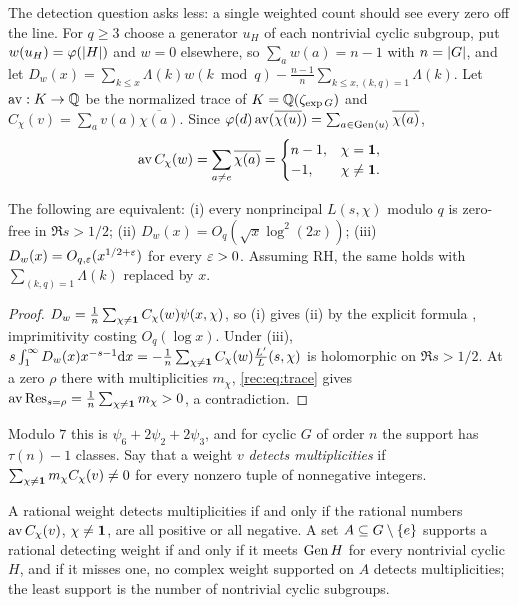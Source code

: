 The detection question asks less: a single weighted count should see every zero off the line. For
$q\ge3$ choose a generator $u_H$ of each nontrivial cyclic subgroup, put $w(u_H)=\varphi(\lvert H\rvert)$ and
$w=0$ elsewhere, so $\sum_aw(a)=n-1$ with $n=\lvert G\rvert$, and let
$D_w(x)=\sum_{k\le x}\Lambda(k)w(k\bmod q)-\frac{n-1}n\sum_{k\le x,(k,q)=1}\Lambda(k)$. Let
$\operatorname{av}:K\to\mathbb{Q}$ be the normalized trace of $K=\mathbb{Q}(\zeta_{\exp G})$ and $C_\chi(v)=\sum_av(a)\overline{\chi(a)}$.
Since $\varphi(d)\operatorname{av}(\overline{\chi(u)})=\sum_{a\in\operatorname{Gen}\langle u\rangle}\overline{\chi(a)}$,
\begin{equation}\label{rec:eq:trace}
 \operatorname{av} C_\chi(w)=\sum_{a\ne e}\overline{\chi(a)}=\begin{cases}n-1,&\chi=\mathbf{1},\\-1,&\chi\ne\mathbf{1}.\end{cases}
\end{equation}

\begin{theorem}\label{rec:thm:sparsecount}
The following are equivalent: \textup{(i)} every nonprincipal $L(s,\chi)$ modulo $q$ is zero-free in
$\Re s>1/2$; \textup{(ii)} $D_w(x)=O_q(\sqrt x\log^2(2x))$; \textup{(iii)} $D_w(x)=O_{q,\varepsilon}(x^{1/2+\varepsilon})$
for every $\varepsilon>0$. Assuming RH, the same holds with $\sum_{(k,q)=1}\Lambda(k)$ replaced by $x$.
\end{theorem}

\begin{proof}
$D_w=\frac1n\sum_{\chi\ne\mathbf{1}}C_\chi(w)\psi(x,\chi)$, so (i) gives (ii) by the explicit formula
\cite{ErnvallHytonenPalojarvi2022Explicit}, imprimitivity costing $O_q(\log x)$. Under (iii),
$s\int_1^\infty D_w(x)x^{-s-1}\mathrm{d} x=-\frac1n\sum_{\chi\ne\mathbf{1}}C_\chi(w)\frac{L'}L(s,\chi)$ is holomorphic on
$\Re s>1/2$. At a zero $\rho$ there with multiplicities $m_\chi$, \eqref{rec:eq:trace} gives
$\operatorname{av}\operatorname{Res}_{s=\rho}=\frac1n\sum_{\chi\ne\mathbf{1}}m_\chi>0$, a contradiction.
\end{proof}

Modulo $7$ this is $\psi_6+2\psi_2+2\psi_3$, and for cyclic $G$ of order $n$ the support has
$\tau(n)-1$ classes. Say that a weight $v$ \emph{detects multiplicities} if
$\sum_{\chi\ne\mathbf{1}}m_\chi C_\chi(v)\ne0$ for every nonzero tuple of nonnegative integers.

\begin{theorem}\label{rec:thm:detecting}
A rational weight detects multiplicities if and only if the rational numbers $\operatorname{av} C_\chi(v)$,
$\chi\ne\mathbf{1}$, are all positive or all negative. A set $A\subseteq G\setminus\{e\}$ supports a rational
detecting weight if and only if it meets $\operatorname{Gen} H$ for every nontrivial cyclic $H$, and if it
misses one, no complex weight supported on $A$ detects multiplicities; the least support is the
number of nontrivial cyclic subgroups.
\end{theorem}

